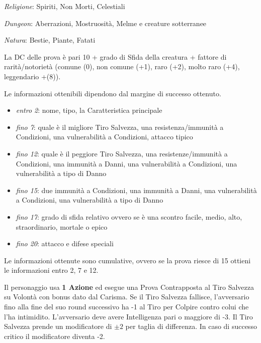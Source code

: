 \documentclass[landscape,10pt,a4paper]{article}
\begin{document}
\begin{multicols}{3}
\begin{dmbox}[title=Riconoscere i mostri - pagina \pageref{riconosceremostro}]
\emph{Religione}: Spiriti, Non Morti, Celestiali

\emph{Dungeon}: Aberrazioni, Mostruosità, Melme e creature sotterranee

\emph{Natura}: Bestie, Piante, Fatati

\medskip

La DC delle prova è pari 10 + grado di Sfida della creatura + fattore di rarità/notorietà (comune (0), non comune (+1), raro (+2), molto raro (+4), leggendario +(8)).

Le informazioni ottenibili dipendono dal margine di successo ottenuto.

\noindent\begin{itemize}\setlength{\itemsep}{0pt}
\item \emph{entro 2}: nome, tipo, la Caratteristica principale
\item \emph{fino 7}: quale è il migliore Tiro Salvezza, una resistenza/immunità a Condizioni, una vulnerabilità a Condizioni, attacco tipico
\item \emph{fino 12}: quale è il peggiore Tiro Salvezza, una resistenze/immunità a Condizioni, una immunità a Danni, una vulnerabilità a Condizioni, una vulnerabilità a tipo di Danno
\item \emph{fino 15}: due immunità a Condizioni, una immunità a Danni, una vulnerabilità a Condizioni, una vulnerabilità a tipo di Danno
\item \emph{fino 17}: grado di sfida relativo ovvero se è una scontro facile, medio, alto, straordinario, mortale o epico
\item \emph{fino 20}: attacco e difese speciali
\end{itemize}

\medskip

Le informazioni ottenute sono cumulative, ovvero se la prova riesce di 15 ottieni le informazioni entro 2, 7 e 12.
\end{dmbox}


\begin{dmbox}[title=Intimidire - pagina \pageref{intimidire}]
Il personaggio usa \textbf{1 Azione} ed esegue una Prova Contrapposta al Tiro Salvezza su Volontà con bonus dato dal Carisma.
Se il Tiro Salvezza fallisce, l'avversario fino alla fine del suo round successivo ha -1 al Tiro per Colpire contro colui che l'ha intimidito. L'avversario deve avere Intelligenza pari o maggiore di -3. Il Tiro Salvezza prende un modificatore di $\pm2$ per taglia di differenza. In caso di successo critico il modificatore diventa -2.


\end{dmbox}
\end{multicols}
\end{document}
